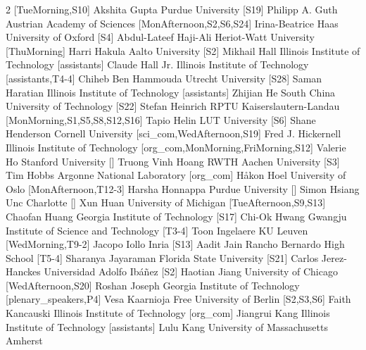 \begin{multicols}{2}
  [TueMorning,S10]
\participantne
  {Akshita Gupta}
  {Purdue University}
  [S19]
\participantne
  {Philipp A. Guth}
  {Austrian Academy of Sciences}
  [MonAfternoon,S2,S6,S24]
\participantne
  {Irina-Beatrice Haas}
  {University of Oxford}
  [S4]
\participantne
  {Abdul-Lateef Haji-Ali}
  {Heriot-Watt University}
  [ThuMorning]
\participantne
  {Harri Hakula}
  {Aalto University}
  [S2]
\participantne
  {Mikhail Hall}
  {Illinois Institute of Technology}
  [assistants]
\participantne
  {Claude Hall Jr.}
  {Illinois Institute of Technology}
  [assistants,T4-4]
\participantne
  {Chiheb Ben Hammouda}
  {Utrecht University}
  [S28]
\participantne
  {Saman Haratian}
  {Illinois Institute of Technology}
  [assistants]
\participantne
  {Zhijian He}
  {South China University of Technology}
  [S22]
\participantne
  {Stefan Heinrich}
  {RPTU Kaiserslautern-Landau}
  [MonMorning,S1,S5,S8,S12,S16]
\participantne
  {Tapio Helin}
  {LUT University}
  [S6]
\participantne
  {Shane Henderson}
  {Cornell University}
  [sci_com,WedAfternoon,S19]
\participantne
  {Fred J. Hickernell}
  {Illinois Institute of Technology}
  [org_com,MonMorning,FriMorning,S12]
\participantne
  {Valerie Ho}
  {Stanford University}
  []
\participantne
  {Truong Vinh Hoang}
  {RWTH Aachen University}
  [S3]
\participantne
  {Tim Hobbs}
  {Argonne National Laboratory}
  [org_com]
\participantne
  {H{\aa}kon Hoel}
  {University of Oslo}
  [MonAfternoon,T12-3]
\participantne
  {Harsha Honnappa}
  {Purdue University}
  []
\participantne
  {Simon Hsiang}
  {Unc Charlotte}
  []
\participantne
  {Xun Huan}
  {University of Michigan}
  [TueAfternoon,S9,S13]
\participantne
  {Chaofan Huang}
  {Georgia Institute of Technology}
  [S17]
\participantne
  {Chi-Ok Hwang}
  {Gwangju Institute of Science and Technology}
  [T3-4]
\participantne
  {Toon Ingelaere}
  {KU Leuven}
  [WedMorning,T9-2]
\participantne
  {Jacopo Iollo}
  {Inria}
  [S13]
\participantne
  {Aadit Jain}
  {Rancho Bernardo High School}
  [T5-4]
\participantne
  {Sharanya Jayaraman}
  {Florida State University}
  [S21]
\participantne
  {Carlos Jerez-Hanckes}
  {Universidad Adolfo Ib\'a\~nez}
  [S2]
\participantne
  {Haotian Jiang}
  {University of Chicago}
  [WedAfternoon,S20]
\participantne
  {Roshan Joseph}
  {Georgia Institute of Technology}
  [plenary_speakers,P4]
\participantne
  {Vesa Kaarnioja}
  {Free University of Berlin}
  [S2,S3,S6]
\participantne
  {Faith Kancauski}
  {Illinois Institute of Technology}
  [org_com]
\participantne
  {Jiangrui Kang}
  {Illinois Institute of Technology}
  [assistants]
\participantne
  {Lulu Kang}
  {University of Massachusetts Amherst}

\end{multicols}
